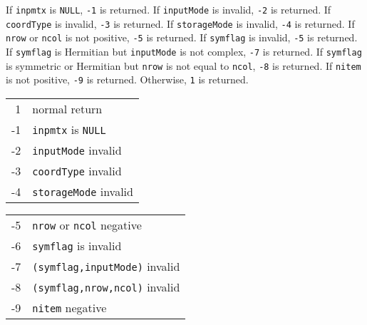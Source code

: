 \begin{enumerate}
If {\tt inpmtx} is {\tt NULL}, {\tt -1} is returned.
If {\tt inputMode} is invalid, {\tt -2} is returned.
If {\tt coordType} is invalid, {\tt -3} is returned.
If {\tt storageMode} is invalid, {\tt -4} is returned.
If {\tt nrow} or {\tt ncol} is not positive, {\tt -5} is returned.
If {\tt symflag} is invalid, {\tt -5} is returned.
If {\tt symflag} is Hermitian but {\tt inputMode} is not complex,
{\tt -7} is returned.
If {\tt symflag} is symmetric or Hermitian but {\tt nrow} is not 
equal to {\tt ncol},
{\tt -8} is returned.
If {\tt nitem} is not positive, {\tt -9} is returned.
Otherwise, {\tt 1} is returned.
\par {}
\begin{center}
\begin{tabular}{rl}
 1 & normal return \\
-1 & {\tt inpmtx} is {\tt NULL} \\
-2 & {\tt inputMode} invalid \\
-3 & {\tt coordType} invalid \\
-4 & {\tt storageMode} invalid \\
\end{tabular}
\quad
\begin{tabular}{rl}
-5 & {\tt nrow} or {\tt ncol} negative \\
-6 & {\tt symflag} is invalid \\
-7 & {\tt (symflag,inputMode)} invalid \\
-8 & {\tt (symflag,nrow,ncol)} invalid \\
-9 & {\tt nitem} negative \\
\end{tabular}
\end{center}
\end{enumerate}
\par
